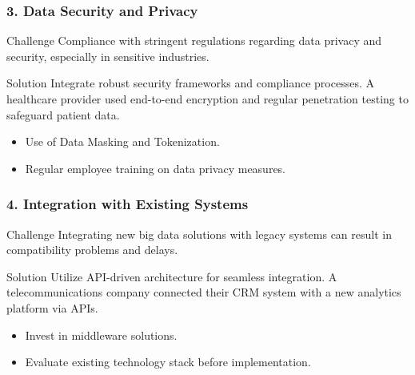 \documentclass[aspectratio=169]{beamer}
\begin{document}
\begin{frame}[fragile]
    \frametitle{3. Data Security and Privacy}
    \begin{block}{Challenge}
        Compliance with stringent regulations regarding data privacy and security, especially in sensitive industries.
    \end{block}
    
    \begin{block}{Solution}
        Integrate robust security frameworks and compliance processes. 
        A healthcare provider used end-to-end encryption and regular penetration testing to safeguard patient data.
    \end{block}
    
    \begin{itemize}
        \item Use of Data Masking and Tokenization.
        \item Regular employee training on data privacy measures.
    \end{itemize}
\end{frame}

\begin{frame}[fragile]
    \frametitle{4. Integration with Existing Systems}
    \begin{block}{Challenge}
        Integrating new big data solutions with legacy systems can result in compatibility problems and delays.
    \end{block}
    
    \begin{block}{Solution}
        Utilize API-driven architecture for seamless integration.
        A telecommunications company connected their CRM system with a new analytics platform via APIs.
    \end{block}
    
    \begin{itemize}
        \item Invest in middleware solutions.
        \item Evaluate existing technology stack before implementation.
    \end{itemize}
\end{frame}
\end{document}
